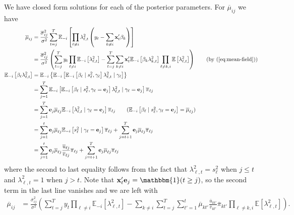 \documentclass{article}
\newcommand{\E}{\mathbb{E}}
\begin{document}
We have closed form solutions for each of the posterior parameters. For $\overline{\mu}_{ij}$ we have
\begin{align*}
    \overline{\mu}_{ij} &=  \frac{\overline{\sigma}_{ij}^2}{\sigma^2}\sum_{t=j}^T\E_{-i}\left[\prod_{\ell\neq i} \lambda_{\ell,t}^2\left(y_t - \sum_{k\neq i} \mathbf{x}'_t\beta_k\right)\right] \\
    &= \frac{\overline{\sigma}_{ij}^2}{\sigma^2}\left(\sum_{t=j}^T y_t \prod_{\ell\neq i} \E_{-i}\left[\lambda_{\ell,t}^2\right] - \sum_{t=j}^T\sum_{k\neq i} \mathbf{x}'_t\E_{-i}\left[\beta_k\lambda^2_{k,t}\right] \prod_{\ell\neq k,i}\E\left[\lambda_{\ell,t}^2\right]\right)  \tag{by (\ref{eq:mean-field})} \\
    \E_{-i}\left[\beta_\ell\lambda^2_{\ell,t}\right] &= \E_{-i}\left\{\E_{-i}\left[\E_{-i}\left[\beta_\ell\;|\; s_\ell^2, \gamma_\ell\right]\lambda^2_{\ell,t}\;|\; \gamma_\ell\right]\right\} \\
    &= \sum_{j=1}^T  \E_{-i}\left[\E_{-i}\left[\beta_\ell\;|\; s_\ell^2, \gamma_\ell = \mathbf{e}_j\right]\lambda^2_{\ell,t}\;|\; \gamma_\ell= \mathbf{e}_j\right] \overline{\pi}_{\ell j} \\
    &=  \sum_{j=1}^T  \mathbf{e}_j \overline{\mu}_{\ell j}\E_{-i}\left[\lambda^2_{\ell,t}\;|\; \gamma_\ell= \mathbf{e}_j\right] \overline{\pi}_{\ell j} \tag{$\E_{-i}\left[\beta_\ell\;|\; s_\ell^2, \gamma_\ell = \mathbf{e}_j\right] = \overline{\mu}_{\ell j}$} \\
    &=  \sum_{j=1}^{t}  \mathbf{e}_j \overline{\mu}_{\ell j}\E_{-i}\left[s_\ell^2\;|\; \gamma_\ell= \mathbf{e}_j\right] \overline{\pi}_{\ell j} + \sum_{j=t+1}^{T}  \mathbf{e}_j \overline{\mu}_{\ell j}\overline{\pi}_{\ell j} \\
    &= \sum_{j=1}^{t}  \mathbf{e}_j \overline{\mu}_{\ell j}\frac{\overline{u}_{\ell j}}{\overline{v}_{\ell j}} \overline{\pi}_{\ell j} + \sum_{j=t+1}^{T}  \mathbf{e}_j \overline{\mu}_{\ell j}\overline{\pi}_{\ell j}
\end{align*}
where the second to last equality follows from the fact that $\lambda_{\ell,t}^2 = s_\ell^2$ when $j \leq t$ and $\lambda_{\ell,t}^2 = 1$ when $j > t$. Note that $\mathbf{x}'_t\mathbf{e}_j  = \mathbbm{1}(t \geq j)$, so the second term in the last line vanishes and we are left with
\begin{align*}
    \overline{\mu}_{ij} &= \frac{\overline{\sigma}_{ij}^2}{\sigma^2}\left(\sum_{t=j}^T y_t \prod_{\ell\neq i} \E_{-i}\left[\lambda_{\ell,t}^2\right] - \sum_{k\neq i}\sum_{t=j}^T\sum_{t'=1}^t\overline{\mu}_{k t'}\frac{\overline{u}_{kt'}}{\overline{v}_{kt'}} \overline{\pi}_{kt'} \prod_{\ell\neq k,i}\E\left[\lambda_{\ell,t}^2\right]\right). 
\end{align*}
\end{document}
